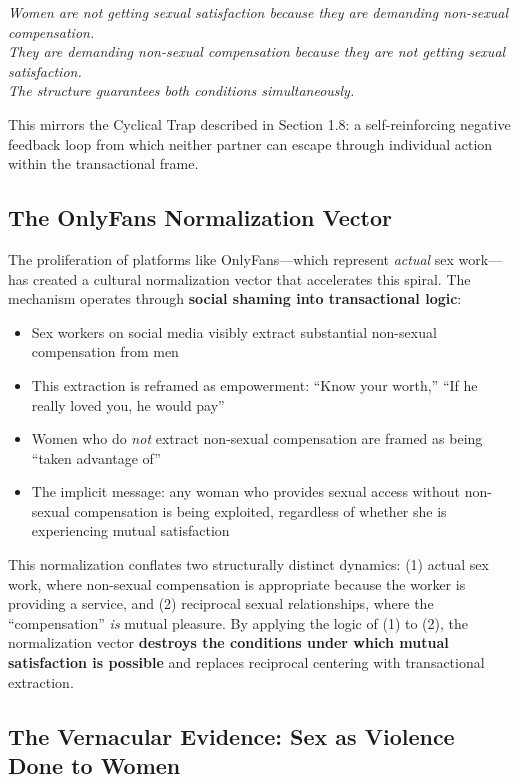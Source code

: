 \documentclass[12pt,openany]{book}
\numberwithin{equation}{chapter}
\begin{document}
\begin{center}
\textit{Women are not getting sexual satisfaction because they are demanding non-sexual compensation.\\
They are demanding non-sexual compensation because they are not getting sexual satisfaction.\\
The structure guarantees both conditions simultaneously.}
\end{center}

This mirrors the Cyclical Trap described in Section 1.8: a self-reinforcing negative feedback loop from which neither partner can escape through individual action within the transactional frame.

\subsection{The OnlyFans Normalization Vector}

The proliferation of platforms like OnlyFans---which represent \textit{actual} sex work---has created a cultural normalization vector that accelerates this spiral. The mechanism operates through \textbf{social shaming into transactional logic}:

\begin{itemize}
    \item Sex workers on social media visibly extract substantial non-sexual compensation from men
    \item This extraction is reframed as empowerment: ``Know your worth,'' ``If he really loved you, he would pay''
    \item Women who do \textit{not} extract non-sexual compensation are framed as being ``taken advantage of''
    \item The implicit message: any woman who provides sexual access without non-sexual compensation is being exploited, regardless of whether she is experiencing mutual satisfaction
\end{itemize}

This normalization conflates two structurally distinct dynamics: (1) actual sex work, where non-sexual compensation is appropriate because the worker is providing a service, and (2) reciprocal sexual relationships, where the ``compensation'' \textit{is} mutual pleasure. By applying the logic of (1) to (2), the normalization vector \textbf{destroys the conditions under which mutual satisfaction is possible} and replaces reciprocal centering with transactional extraction.

\subsection{The Vernacular Evidence: Sex as Violence Done to Women}
\end{document}
